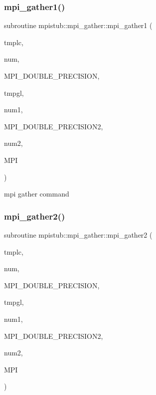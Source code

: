 \mbox{\label{interfacempistub_1_1mpi__gather_afd38a0894f5a19c1f36c999b9fbbdfa8}} 
\subsubsection{\texorpdfstring{mpi\_gather1()}{mpi\_gather1()}}
{\footnotesize\ttfamily subroutine mpistub\+::mpi\+\_\+gather\+::mpi\+\_\+gather1 (\begin{DoxyParamCaption}\item[{double precision, dimension(\+:)}]{tmplc,  }\item[{}]{num,  }\item[{}]{M\+P\+I\+\_\+\+D\+O\+U\+B\+L\+E\+\_\+\+P\+R\+E\+C\+I\+S\+I\+ON,  }\item[{double precision, dimension(\+:)}]{tmpgl,  }\item[{}]{num1,  }\item[{}]{M\+P\+I\+\_\+\+D\+O\+U\+B\+L\+E\+\_\+\+P\+R\+E\+C\+I\+S\+I\+O\+N2,  }\item[{}]{num2,  }\item[{}]{M\+PI }\end{DoxyParamCaption})}



mpi gather command 

\mbox{\label{interfacempistub_1_1mpi__gather_a402fed9230c95b1b4ed06d004476a818}} 
\subsubsection{\texorpdfstring{mpi\_gather2()}{mpi\_gather2()}}
{\footnotesize\ttfamily subroutine mpistub\+::mpi\+\_\+gather\+::mpi\+\_\+gather2 (\begin{DoxyParamCaption}\item[{double precision}]{tmplc,  }\item[{}]{num,  }\item[{}]{M\+P\+I\+\_\+\+D\+O\+U\+B\+L\+E\+\_\+\+P\+R\+E\+C\+I\+S\+I\+ON,  }\item[{double precision, dimension(\+:)}]{tmpgl,  }\item[{}]{num1,  }\item[{}]{M\+P\+I\+\_\+\+D\+O\+U\+B\+L\+E\+\_\+\+P\+R\+E\+C\+I\+S\+I\+O\+N2,  }\item[{}]{num2,  }\item[{}]{M\+PI }\end{DoxyParamCaption})}

